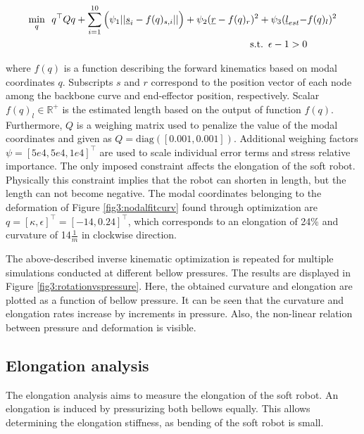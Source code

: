 \begin{equation}
\begin{aligned}
\min_{q} \hspace{5pt}  q^\top Q q  + \sum_{i=1}^{10}\Big(\psi_1 ||\text{\underbar{$s$}}_{i} - f(q)_{s,i}|| \Big) +   \psi_2(\text{\underbar{$r$}}  - f(q)_{r})^2 +  \psi_3(\text{\underbar{$l$}}_{est} - & f(q)_l)^2  \\ 
\text{s.t.} \hspace{5pt} \epsilon - 1 > 0
\end{aligned}
\label{eq3:optim}
\end{equation}


where $f(q)$ is a function describing the forward kinematics based on modal coordinates $q$. Subscripts $s$ and $r$ correspond to the position vector of each node among the backbone curve and end-effector position, respectively. Scalar $f(q)_l \in \mathbb{R}^+$ is the estimated length based on the output of function $f(q)$. Furthermore, $Q$ is a weighing matrix used to penalize the value of the modal coordinates and given as $ Q = \text{diag}([0.001,0.001])$. Additional weighing factors $\psi = [5e4,5e4,1e4]^\top$ are used to scale individual error terms and stress relative importance. The only imposed constraint affects the elongation of the soft robot. Physically this constraint implies that the robot can shorten in length, but the length can not become negative. The modal coordinates belonging to the deformation of Figure \ref{fig3:nodalfitcurv} found through optimization are $q = [\kappa,\epsilon]^\top = [-14,0.24]^\top$, which corresponds to an elongation of 24\% and curvature of 14$\frac{1}{m}$ in clockwise direction.


The above-described inverse kinematic optimization is repeated for multiple simulations conducted at different bellow pressures. The results are displayed in Figure \ref{fig3:rotationvspressure}. Here, the obtained curvature and elongation are plotted as a function of bellow pressure. It can be seen that the curvature and elongation rates increase by increments in pressure. Also, the non-linear relation between pressure and deformation is visible.




\subsection{Elongation analysis}
\label{subsecelong}


The elongation analysis aims to measure the elongation of the soft robot. An elongation is induced by pressurizing both bellows equally. This allows determining the elongation stiffness, as bending of the soft robot is small.

